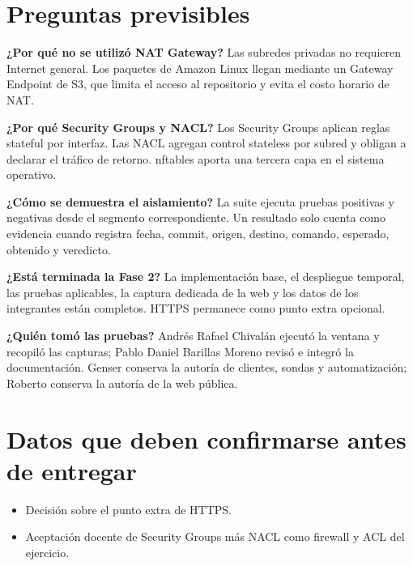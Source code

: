 \documentclass[11pt]{article}
\begin{document}
\section*{Preguntas previsibles}

\textbf{¿Por qué no se utilizó NAT Gateway?} Las subredes privadas no requieren Internet general.
Los paquetes de Amazon Linux llegan mediante un Gateway Endpoint de S3, que limita el acceso al
repositorio y evita el costo horario de NAT.

\textbf{¿Por qué Security Groups y NACL?} Los Security Groups aplican reglas stateful por interfaz.
Las NACL agregan control stateless por subred y obligan a declarar el tráfico de retorno. nftables
aporta una tercera capa en el sistema operativo.

\textbf{¿Cómo se demuestra el aislamiento?} La suite ejecuta pruebas positivas y negativas desde
el segmento correspondiente. Un resultado solo cuenta como evidencia cuando registra fecha,
commit, origen, destino, comando, esperado, obtenido y veredicto.

\textbf{¿Está terminada la Fase 2?} La implementación base, el despliegue temporal, las pruebas
aplicables, la captura dedicada de la web y los datos de los integrantes están completos. HTTPS
permanece como punto extra opcional.

\textbf{¿Quién tomó las pruebas?} Andrés Rafael Chivalán ejecutó la ventana y recopiló las
capturas; Pablo Daniel Barillas Moreno revisó e integró la documentación. Genser conserva la
autoría de clientes, sondas y automatización; Roberto conserva la autoría de la web pública.

\section*{Datos que deben confirmarse antes de entregar}

\begin{itemize}
  \item Decisión sobre el punto extra de HTTPS.
  \item Aceptación docente de Security Groups más NACL como firewall y ACL del ejercicio.
\end{itemize}
\end{document}
